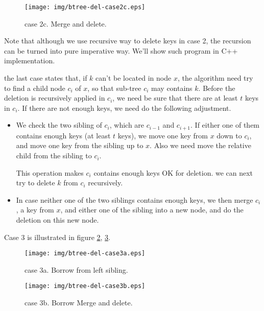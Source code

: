 \documentclass{article}
\begin{document}
\begin{figure}[htbp]
  \begin{center}
    \texttt{[image: img/btree-del-case2c.eps]}
    \caption{case 2c. Merge and delete.} \label{fig:btree-del-case2c}
  \end{center}
\end{figure}

Note that although we use recursive way to delete keys in case 2, the
recursion can be turned into pure imperative way. We'll show such
program in C++ implementation.

the last case states that, if $k$ can't be located in node $x$, the algorithm
need try to find a child node $c_i$ of $x$, so that sub-tree $c_i$ may
contains $k$. Before the deletion is recursively applied in $c_i$, we
need be sure that there are at least $t$ keys in $c_i$. If there are
not enough keys, we need do the following adjustment.

\begin{itemize}
\item We check the two sibling of $c_i$, which are $c_{i-1}$ and $c_{i+1}$.
If either one of them contains enough keys (at least $t$ keys), we move
one key from $x$ down to $c_i$, and move one key from the sibling up to
$x$. Also we need move the relative child from the sibling to $c_i$.

This operation makes $c_i$ contains enough keys OK for deletion. we can
next try to delete $k$ from $c_i$ recursively.

\item In case neither one of the two siblings contains enough keys, we then
merge $c_i$, a key from $x$, and either one of the sibling into a new
node, and do the deletion on this new node.
\end{itemize}

Case 3 is illustrated in figure \ref{fig:btree-del-case3a}, \ref{fig:btree-del-case3b}.

\begin{figure}[htbp]
  \begin{center}
    \texttt{[image: img/btree-del-case3a.eps]}
    \caption{case 3a. Borrow from left sibling.} \label{fig:btree-del-case3a}
  \end{center}
\end{figure}

\begin{figure}[htbp]
  \begin{center}
    \texttt{[image: img/btree-del-case3b.eps]}
    \caption{case 3b. Borrow Merge and delete.} \label{fig:btree-del-case3b}
  \end{center}
\end{figure}
\end{document}
